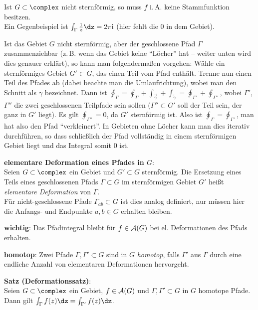 Ist $G \subset \complex$ nicht sternförmig, so muss $f$ i.\,A. keine
Stammfunktion besitzen.\\
Ein Gegenbeispiel ist $\int_\Gamma \frac{1}{z} \dz = 2\pi\i$
(hier fehlt die $0$ in dem Gebiet).

Ist das Gebiet $G$ nicht sternförmig, aber der geschlossene Pfad $\Gamma$
zusammenziehbar (z.\,B. wenn das Gebiet keine "`Löcher"' hat --
weiter unten wird dies genauer erklärt), so kann man folgendermaßen vorgehen:
Wähle ein sternförmiges Gebiet $G' \subset G$, das einen Teil vom Pfad enthält.
Trenne nun einen Teil des Pfades ab (dabei beachte man die Umlaufrichtung),
wobei man den Schnitt als $\gamma$ bezeichnet.
Dann ist $\oint_\Gamma = \oint_\Gamma +
\int_{\overrightarrow{\gamma}} + \int_{\overleftarrow{\gamma}} =
\oint_{\Gamma'} + \oint_{\Gamma''}$, wobei $\Gamma'$, $\Gamma''$ die zwei
geschlossenen Teilpfade sein sollen ($\Gamma'' \subset G'$ soll der Teil sein,
der ganz in $G'$ liegt).
Es gilt $\oint_{\Gamma''} = 0$, da $G'$ sternförmig ist.
Also ist $\oint_\Gamma = \oint_{\Gamma'}$, man hat also den Pfad
"`verkleinert"'.
In Gebieten ohne Löcher kann man dies iterativ durchführen, so dass
schließlich der Pfad vollständig in einem sternförmigen Gebiet liegt
und das Integral somit $0$ ist.

\linie
\pagebreak

\textbf{elementare Deformation eines Pfades in $G$}:\\
Seien $G \subset \complex$ ein Gebiet und $G' \subset G$ sternförmig.
Die Ersetzung eines Teils eines geschlossenen Pfads $\Gamma \subset G$
im sternförmigen Gebiet $G'$ heißt \emph{elementare Deformation}
von $\Gamma$.\\
Für nicht-geschlossene Pfade $\Gamma_{ab} \subset G$ ist dies analog definiert,
nur müssen hier die Anfangs- und Endpunkte $a, b \in G$ erhalten bleiben.

\textbf{wichtig}:
Das Pfadintegral bleibt für $f \in \mathcal{A}(G)$ bei el. Deformationen des
Pfads erhalten.

\textbf{homotop}:
Zwei Pfade $\Gamma, \Gamma' \subset G$ sind in $G$ \emph{homotop}, falls
$\Gamma'$ aus $\Gamma$ durch eine endliche Anzahl von elementaren Deformationen
hervorgeht.

\textbf{Satz (Deformationssatz)}:\\
Seien $G \subset \complex$ ein Gebiet, $f \in \mathcal{A}(G)$ und
$\Gamma, \Gamma' \subset G$ in $G$ homotope Pfade.\\
Dann gilt $\int_\Gamma f(z)\dz = \int_{\Gamma'} f(z)\dz$.

